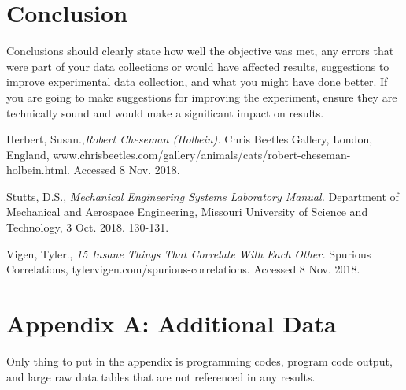 \documentclass[11pt,a4paper]{article}
\begin{document}
\section*{Conclusion}
Conclusions should clearly state how well the objective was met, any errors that were part of your data collections or would have affected results, suggestions to improve experimental data collection, and what you might have done better. If you are going to make suggestions for improving the experiment, ensure they are technically sound and would make a significant impact on results.

\begin{thebibliography}{3} %

  Herbert, Susan.,\emph{Robert Cheseman (Holbein).}
  Chris Beetles Gallery, London, England, www.chrisbeetles.com/gallery/animals/cats/robert-cheseman-holbein.html. Accessed 8 Nov. 2018.
  
  Stutts, D.S., \emph{Mechanical Engineering Systems Laboratory Manual.}
  Department of Mechanical and Aerospace Engineering, Missouri University of Science and Technology, 3 Oct. 2018. 130-131.
  
  Vigen, Tyler., \emph{15 Insane Things That Correlate With Each Other.}
  Spurious Correlations, tylervigen.com/spurious-correlations. Accessed 8 Nov. 2018.

\end{thebibliography}

\newpage %
\section*{Appendix A: Additional Data}
Only thing to put in the appendix is programming codes, program code output, and large raw data tables that are not referenced in any results.
\end{document}
